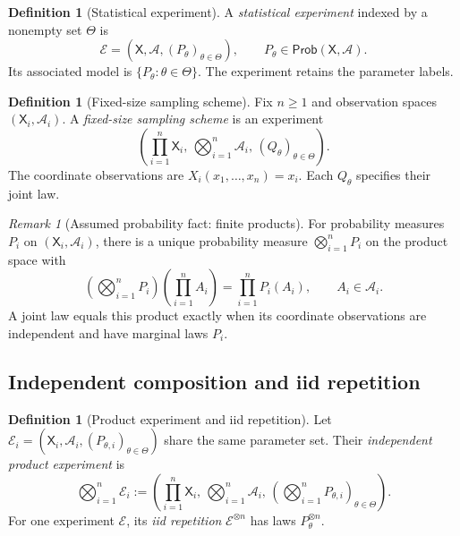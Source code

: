 \documentclass[11pt,oneside]{book}
\theoremstyle{definition}
\newtheorem{definition}[theorem]{Definition}
\theoremstyle{remark}
\newtheorem*{remark}{Remark}
\newcommand{\Prob}{\mathsf{Prob}}
\begin{document}
\begin{definition}[Statistical experiment]
\label{def:statistical-experiment}
A \emph{statistical experiment} indexed by a nonempty set $\Theta$ is
\[
\mathcal E=(\mathsf X,\mathcal A,(P_\theta)_{\theta\in\Theta}),
\qquad P_\theta\in\Prob(\mathsf X,\mathcal A).
\]
Its associated model is $\{P_\theta:\theta\in\Theta\}$.
The experiment retains the parameter labels.
\end{definition}

\begin{definition}[Fixed-size sampling scheme]
\label{def:fixed-size-sampling}
Fix $n\geq1$ and observation spaces $(\mathsf X_i,\mathcal A_i)$.
A \emph{fixed-size sampling scheme} is an experiment
\[
\left(\prod_{i=1}^n\mathsf X_i,\,
\bigotimes_{i=1}^n\mathcal A_i,\,
(Q_\theta)_{\theta\in\Theta}\right).
\]
The coordinate observations are $X_i(x_1,\ldots,x_n)=x_i$.
Each $Q_\theta$ specifies their joint law.
\end{definition}

\begin{remark}[Assumed probability fact: finite products]
For probability measures $P_i$ on $(\mathsf X_i,\mathcal A_i)$, there is a
unique probability measure $\bigotimes_{i=1}^nP_i$ on the product space with
\[
\left(\bigotimes_{i=1}^nP_i\right)
\left(\prod_{i=1}^n A_i\right)=\prod_{i=1}^nP_i(A_i),
\qquad A_i\in\mathcal A_i.
\]
A joint law equals this product exactly when its coordinate observations
are independent and have marginal laws $P_i$.
\end{remark}

\subsection{Independent composition and iid repetition}
\label{subsec:product-experiments}

\begin{definition}[Product experiment and iid repetition]
\label{def:product-experiment}
Let $\mathcal E_i=(\mathsf X_i,\mathcal A_i,
(P_{\theta,i})_{\theta\in\Theta})$ share the same parameter set.
Their \emph{independent product experiment} is
\[
\bigotimes_{i=1}^n\mathcal E_i
:=
\left(\prod_{i=1}^n\mathsf X_i,\,
\bigotimes_{i=1}^n\mathcal A_i,\,
\left(\bigotimes_{i=1}^nP_{\theta,i}\right)_{\theta\in\Theta}\right).
\]
For one experiment $\mathcal E$, its \emph{iid repetition}
$\mathcal E^{\otimes n}$ has laws $P_\theta^{\otimes n}$.
\end{definition}
\end{document}
